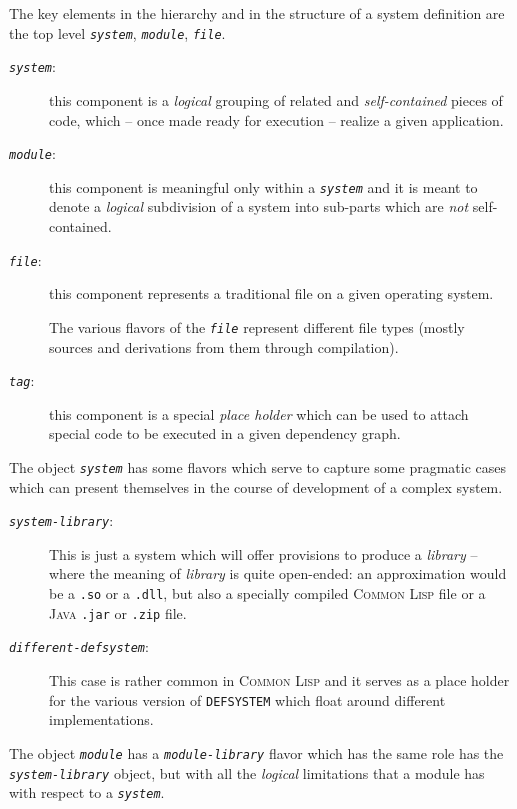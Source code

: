 \documentclass[a4paper]{article}
\newcommand{\CL}{\textsc{Common Lisp}}
\newcommand{\Java}{\textsc{Java}}
\newcommand{\code}[1]{\texttt{#1}}
\newcommand{\object}[1]{\texttt{\textit{#1}}} %
\begin{document}
The key elements in the hierarchy and in the structure of a system
definition are the top level \object{system}, \object{module}, \object{file}.
\begin{description}
\item[{\object{system}:}]
        this component is a \emph{logical} grouping of
        related and \emph{self-contained} pieces of code, which -- once made
        ready for execution -- realize a given application.

\item[{\object{module}:}]
        this component is meaningful only within a \object{system} and
        it is meant to denote a \emph{logical} subdivision of a system
        into sub-parts which are \emph{not} self-contained.

\item[{\object{file}:}]
        this component represents a traditional file on a given
        operating system.

        The various flavors of the \object{file} represent different
        file types (mostly sources and derivations from them through
        compilation).

\item[{\object{tag}:}]
        this component is a special \emph{place holder} which can be
        used to attach special code to be executed in a given
        dependency graph.
\end{description}

The object \object{system} has some flavors which serve to capture
some pragmatic cases which can present themselves in the course of
development of a complex system.

\begin{description}
\item[{\object{system-library}:}] This is just a system which will
        offer provisions to produce a \emph{library} -- where the
        meaning of \emph{library} is quite open-ended: an
        approximation would be a \code{.so} or a \code{.dll}, but also
        a specially compiled \CL{} file or a \Java{} \code{.jar} or
        \code{.zip} file.

\item[{\object{different-defsystem}:}] This case is rather common in
        \CL{} and it serves as a place holder for the various version of
        \code{DEFSYSTEM} which float around different implementations.
\end{description}

The object \object{module} has a \object{module-library} flavor which
has the same role has the \object{system-library} object, but with all
the \emph{logical} limitations that a module has with respect to a
\object{system}.
\end{document}
